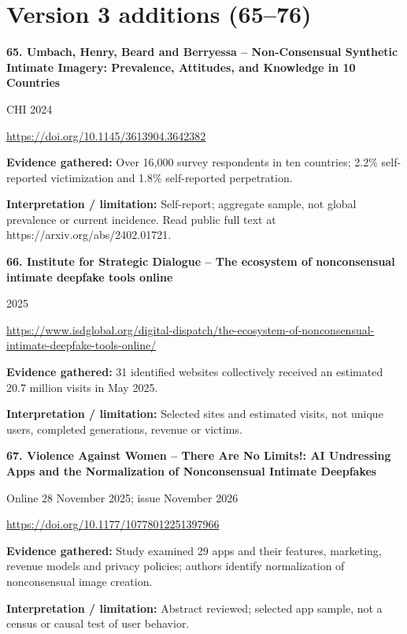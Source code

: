 \documentclass[11pt,a4paper]{article}
\begin{document}
\section*{Version 3 additions (65--76)}
\noindent\begin{minipage}{\linewidth}\textbf{65. Umbach, Henry, Beard and Berryessa -- Non-Consensual Synthetic Intimate Imagery: Prevalence, Attitudes, and Knowledge in 10 Countries}\par{\small CHI 2024\par\url{https://doi.org/10.1145/3613904.3642382}}\par
\textbf{Evidence gathered:} Over 16,000 survey respondents in ten countries; 2.2\% self-reported victimization and 1.8\% self-reported perpetration.\par\textbf{Interpretation / limitation:} Self-report; aggregate sample, not global prevalence or current incidence. Read public full text at https://arxiv.org/abs/2402.01721.\par\end{minipage}\par\vspace{2mm}
\noindent\begin{minipage}{\linewidth}\textbf{66. Institute for Strategic Dialogue -- The ecosystem of nonconsensual intimate deepfake tools online}\par{\small 2025\par\url{https://www.isdglobal.org/digital-dispatch/the-ecosystem-of-nonconsensual-intimate-deepfake-tools-online/}}\par
\textbf{Evidence gathered:} 31 identified websites collectively received an estimated 20.7 million visits in May 2025.\par\textbf{Interpretation / limitation:} Selected sites and estimated visits, not unique users, completed generations, revenue or victims.\par\end{minipage}\par\vspace{2mm}
\noindent\begin{minipage}{\linewidth}\textbf{67. Violence Against Women -- There Are No Limits!: AI Undressing Apps and the Normalization of Nonconsensual Intimate Deepfakes}\par{\small Online 28 November 2025; issue November 2026\par\url{https://doi.org/10.1177/10778012251397966}}\par
\textbf{Evidence gathered:} Study examined 29 apps and their features, marketing, revenue models and privacy policies; authors identify normalization of nonconsensual image creation.\par\textbf{Interpretation / limitation:} Abstract reviewed; selected app sample, not a census or causal test of user behavior.\par\end{minipage}\par\vspace{2mm}
\end{document}
